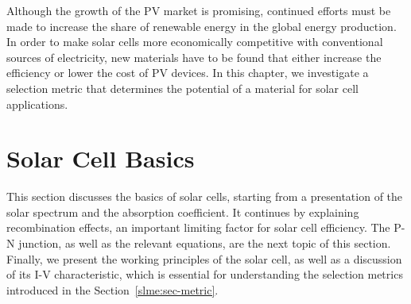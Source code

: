 \begin{refsection}
Although the growth of the PV market is promising, continued efforts must be 
made to increase the share of renewable energy in the global energy 
production. In order to make solar cells more economically competitive with 
conventional sources of electricity, new materials have to be found that 
either increase the efficiency or lower the cost of PV devices. In this 
chapter, we investigate a selection metric that determines the potential of a 
material for solar cell applications. 

 
\section{Solar Cell Basics} \label{slme:sec-basics} 
 
This section discusses the basics of solar cells, starting from a presentation 
of the solar spectrum and the absorption coefficient. It continues by 
explaining recombination effects, an important limiting factor for solar cell 
efficiency. The P-N junction, as well as the relevant equations, are the next 
topic of this section. Finally, we present the working principles of the solar 
cell, as well as a discussion of its I-V characteristic, which is essential 
for understanding the selection metrics introduced in the 
Section~\ref{slme:sec-metric}. 
 

\end{refsection}
